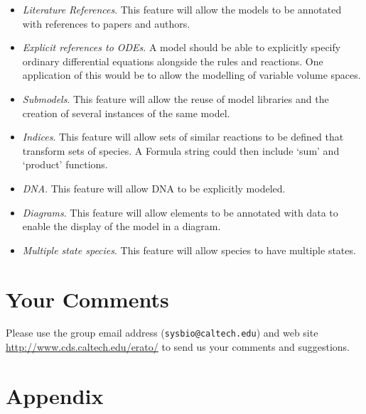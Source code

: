 \documentclass[10pt]{cek-article}
\newcommand{\eratowebloc}{\url{http://www.cds.caltech.edu/erato/}}
\begin{document}
\begin{itemize}

\item \emph{Literature References}.  This feature will allow the models to
  be annotated with references to papers and authors.

\item \emph{Explicit references to ODEs}.  A model should be able to
  explicitly specify ordinary differential equations alongside the rules
  and reactions. One application of this would be to allow the modelling of
  variable volume spaces.

\item \emph{Submodels}.  This feature will allow the reuse of model
  libraries and the creation of several instances of the same model.

\item \emph{Indices}.  This feature will allow sets of similar reactions to
  be defined that transform sets of species.  A Formula string could then
  include `sum' and `product' functions.

\item \emph{DNA}.  This feature will allow DNA to be explicitly modeled.

\item \emph{Diagrams}.  This feature will allow elements to be annotated
  with data to enable the display of the model in a diagram.

\item \emph{Multiple state species}. This feature will allow species to have multiple states.

\end{itemize}

\section{Your Comments}
\label{sec:what}

Please use the group email address (\texttt{sysbio@caltech.edu})
and web site \eratowebloc{} to send us your comments and
suggestions.


\setcounter{secnumdepth}{-1}
\section{Appendix}
\setcounter{secnumdepth}{2}
\end{document}
